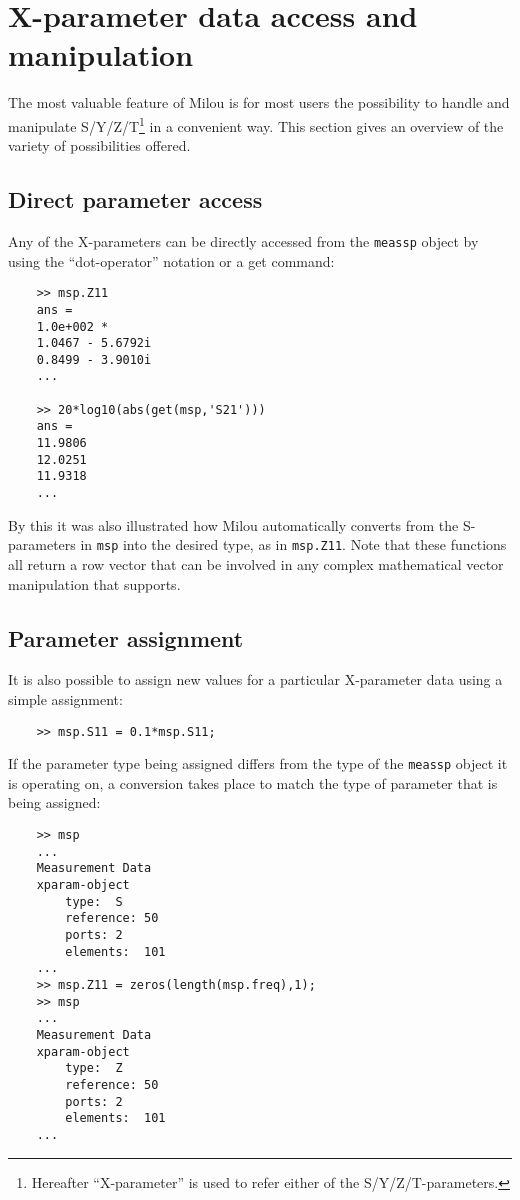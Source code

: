 %
%
%
\section{X-parameter data access and manipulation}\label{sec:SPMod}
The most valuable feature of Milou is for most users the
possibility to handle and manipulate S/Y/Z/T\footnote{Hereafter
``X-parameter'' is used to refer either of the
S/Y/Z/T-parameters.} in a convenient way. This section gives an
overview of the variety of possibilities offered.

\subsection{Direct parameter access}
Any of the X-parameters can be directly accessed from the
\verb"meassp" object by using the ``dot-operator'' notation or a
get command:

\begin{small}
\begin{verbatim}
    >> msp.Z11
    ans =
    1.0e+002 *
    1.0467 - 5.6792i
    0.8499 - 3.9010i
    ...

    >> 20*log10(abs(get(msp,'S21')))
    ans =
    11.9806
    12.0251
    11.9318
    ...
\end{verbatim}
\end{small}

By this it was also illustrated how Milou automatically converts
from the S-para\-meters in \verb"msp" into the desired type, as in
\verb"msp.Z11". Note that these functions all return a row vector
that can be involved in any complex mathematical vector
manipulation that \matlab supports.

\subsection{Parameter assignment}
It is also possible to assign new values for a particular
X-parameter data using a simple assignment:
\begin{small}
\begin{verbatim}
    >> msp.S11 = 0.1*msp.S11;
\end{verbatim}
\end{small}
If the parameter type being assigned differs from the type of the
\verb"meassp" object it is operating on, a conversion takes place
to match the type of parameter that is being assigned:
\begin{small}
\begin{verbatim}
    >> msp
    ...
    Measurement Data
    xparam-object
        type:  S
        reference: 50
        ports: 2
        elements:  101
    ...
    >> msp.Z11 = zeros(length(msp.freq),1);
    >> msp
    ...
    Measurement Data
    xparam-object
        type:  Z
        reference: 50
        ports: 2
        elements:  101
    ...
\end{verbatim}
\end{small}

